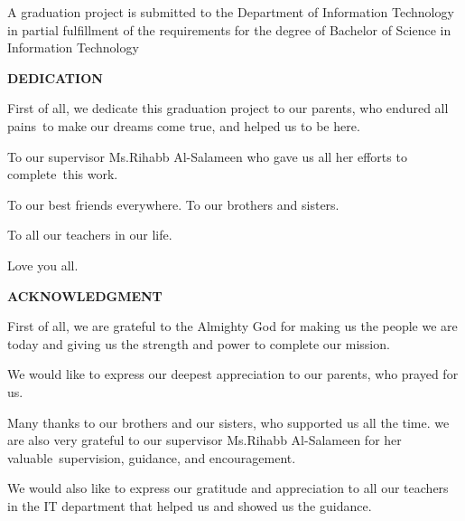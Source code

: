 \documentclass[12pt]{article}
\begin{document}
	\begin{center}
	\vspace*{1cm}A graduation project is submitted to the Department of Information Technology in partial fulfillment of the requirements for the degree of Bachelor of Science in Information Technology \vspace{0.2cm}
	\end{center}
	\begin{center}
		\date{\today}
		\newpage
	\end{center}
	\begin{center}
		\textbf{DEDICATION}\\
		\begin{center}
		\end{center}
		First of all, we dedicate this graduation project to our parents, who endured all pains to make our dreams come true, and helped us to be here.
		
		To our supervisor Ms.Rihabb Al-Salameen who gave us all her efforts to complete this work.
		
		To our best friends everywhere. To our brothers and sisters.
		
		To all our teachers in our life.
		
		Love you all.
	\end{center}
	\newpage
	\begin{center}
		\textbf{ACKNOWLEDGMENT}\\
		\begin{center}
		\end{center}
		First of all, we are grateful to the Almighty God for making us the people we are today and giving us the strength and power to complete our mission.
		
		We would like to express our deepest appreciation to our parents, who prayed for us.
		
		Many thanks to our brothers and our sisters, who supported us all the time.
		we are also very grateful to our supervisor Ms.Rihabb Al-Salameen for her valuable supervision, guidance, and encouragement.
		
		We would also like to express our gratitude and appreciation to all our teachers in the IT department that helped us and showed us the guidance.
		
	\end{center}
	\newpage
\end{document}
